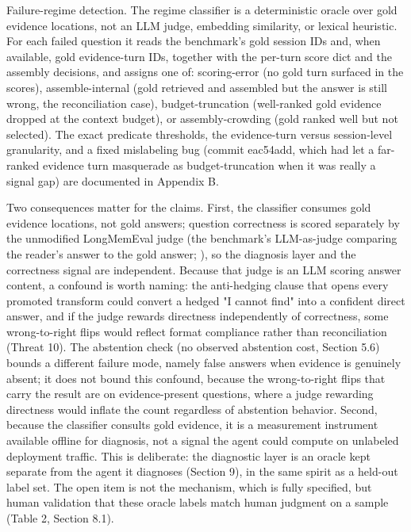 Failure-regime detection. The regime classifier is a deterministic oracle over gold evidence locations, not an LLM judge, embedding similarity, or lexical heuristic. For each failed question it reads the benchmark's gold session IDs and, when available, gold evidence-turn IDs, together with the per-turn score dict and the assembly decisions, and assigns one of: scoring-error (no gold turn surfaced in the scores), assemble-internal (gold retrieved and assembled but the answer is still wrong, the reconciliation case), budget-truncation (well-ranked gold evidence dropped at the context budget), or assembly-crowding (gold ranked well but not selected). The exact predicate thresholds, the evidence-turn versus session-level granularity, and a fixed mislabeling bug (commit eac54add, which had let a far-ranked evidence turn masquerade as budget-truncation when it was really a signal gap) are documented in Appendix B.

Two consequences matter for the claims. First, the classifier consumes gold evidence locations, not gold answers; question correctness is scored separately by the unmodified LongMemEval judge (the benchmark's LLM-as-judge comparing the reader's answer to the gold answer; \citet{wu2024longmemeval}), so the diagnosis layer and the correctness signal are independent. Because that judge is an LLM scoring answer content, a confound is worth naming: the anti-hedging clause that opens every promoted transform could convert a hedged "I cannot find" into a confident direct answer, and if the judge rewards directness independently of correctness, some wrong-to-right flips would reflect format compliance rather than reconciliation (Threat 10). The abstention check (no observed abstention cost, Section 5.6) bounds a different failure mode, namely false answers when evidence is genuinely absent; it does not bound this confound, because the wrong-to-right flips that carry the result are on evidence-present questions, where a judge rewarding directness would inflate the count regardless of abstention behavior. Second, because the classifier consults gold evidence, it is a measurement instrument available offline for diagnosis, not a signal the agent could compute on unlabeled deployment traffic. This is deliberate: the diagnostic layer is an oracle kept separate from the agent it diagnoses (Section 9), in the same spirit as a held-out label set. The open item is not the mechanism, which is fully specified, but human validation that these oracle labels match human judgment on a sample (Table 2, Section 8.1).

